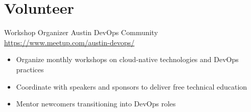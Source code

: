 \documentclass[a4paper, serif, 10pt]{moderncv}
\begin{document}
\section{Volunteer}

        {Workshop Organizer}
        {Austin DevOps Community}
        {\url{https://www.meetup.com/austin-devops/}}
        {}
        {\begin{itemize}
\item Organize monthly workshops on cloud-native technologies and DevOps practices
\item Coordinate with speakers and sponsors to deliver free technical education
\item Mentor newcomers transitioning into DevOps roles
\end{itemize}}
    
\end{document}
